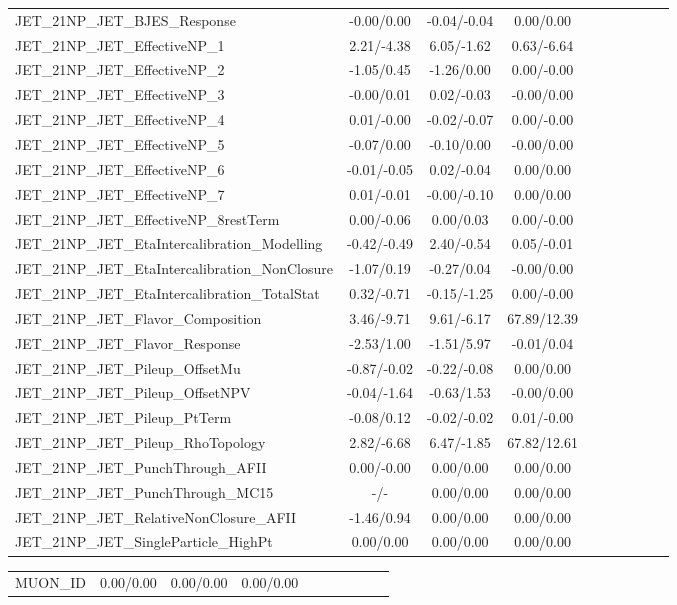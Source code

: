 \begin{table}[h]
\begin{center}
\begin{tabular}{l|ccccccccc}
JET\_21NP\_JET\_BJES\_Response &-0.00/0.00 &-0.04/-0.04 &0.00/0.00 \\
JET\_21NP\_JET\_EffectiveNP\_1 &2.21/-4.38 &6.05/-1.62 &0.63/-6.64 \\
JET\_21NP\_JET\_EffectiveNP\_2 &-1.05/0.45 &-1.26/0.00 &0.00/-0.00 \\
JET\_21NP\_JET\_EffectiveNP\_3 &-0.00/0.01 &0.02/-0.03 &-0.00/0.00 \\
JET\_21NP\_JET\_EffectiveNP\_4 &0.01/-0.00 &-0.02/-0.07 &0.00/-0.00 \\
JET\_21NP\_JET\_EffectiveNP\_5 &-0.07/0.00 &-0.10/0.00 &-0.00/0.00 \\
JET\_21NP\_JET\_EffectiveNP\_6 &-0.01/-0.05 &0.02/-0.04 &0.00/0.00 \\
JET\_21NP\_JET\_EffectiveNP\_7 &0.01/-0.01 &-0.00/-0.10 &0.00/0.00 \\
JET\_21NP\_JET\_EffectiveNP\_8restTerm &0.00/-0.06 &0.00/0.03 &0.00/-0.00 \\
JET\_21NP\_JET\_EtaIntercalibration\_Modelling &-0.42/-0.49 &2.40/-0.54 &0.05/-0.01 \\
JET\_21NP\_JET\_EtaIntercalibration\_NonClosure &-1.07/0.19 &-0.27/0.04 &-0.00/0.00 \\
JET\_21NP\_JET\_EtaIntercalibration\_TotalStat &0.32/-0.71 &-0.15/-1.25 &0.00/-0.00 \\
JET\_21NP\_JET\_Flavor\_Composition &3.46/-9.71 &9.61/-6.17 &67.89/12.39 \\
JET\_21NP\_JET\_Flavor\_Response &-2.53/1.00 &-1.51/5.97 &-0.01/0.04 \\
JET\_21NP\_JET\_Pileup\_OffsetMu &-0.87/-0.02 &-0.22/-0.08 &0.00/0.00 \\
JET\_21NP\_JET\_Pileup\_OffsetNPV &-0.04/-1.64 &-0.63/1.53 &-0.00/0.00 \\
JET\_21NP\_JET\_Pileup\_PtTerm &-0.08/0.12 &-0.02/-0.02 &0.01/-0.00 \\
JET\_21NP\_JET\_Pileup\_RhoTopology &2.82/-6.68 &6.47/-1.85 &67.82/12.61 \\
JET\_21NP\_JET\_PunchThrough\_AFII &0.00/-0.00 &0.00/0.00 &0.00/0.00 \\
JET\_21NP\_JET\_PunchThrough\_MC15 &-/- &0.00/0.00 &0.00/0.00 \\
JET\_21NP\_JET\_RelativeNonClosure\_AFII &-1.46/0.94 &0.00/0.00 &0.00/0.00 \\
JET\_21NP\_JET\_SingleParticle\_HighPt &0.00/0.00 &0.00/0.00 &0.00/0.00 \\
\hline \end{tabular} \end{center} \end{table} \begin{table}[h] \scriptsize \begin{center} \begin{tabular}{l|ccccccccc} \hline MUON\_ID &0.00/0.00 &0.00/0.00 &0.00/0.00 \\

\end{tabular}
\end{center}
\end{table}
